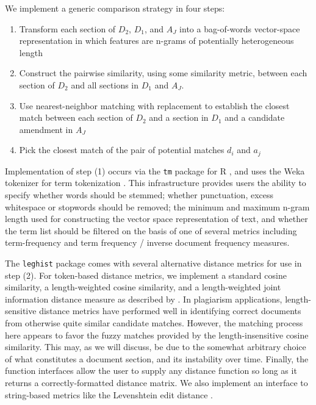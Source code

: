 \documentclass[11pt]{article}
\begin{document}
We implement a generic comparison strategy in four steps:
\begin{enumerate}
\item Transform each section of $D_2$, $D_1$, and $A_J$ into a
  bag-of-words vector-space representation in which features are
  n-grams of potentially heterogeneous length
\item Construct the pairwise similarity, using some similarity metric,
  between each section of $D_2$ and all sections in $D_1$ and $A_J$.
\item Use nearest-neighbor matching with replacement to establish
  the closest match between each section of $D_2$ and a section in
  $D_1$ and a candidate amendment in $A_J$
\item Pick the closest match of the pair of potential matches $d_i$
  and $a_j$
\end{enumerate}

Implementation of step (1) occurs via the \texttt{tm} package for R \citep{meyer2008text},
and uses the Weka tokenizer for term
tokenization \citep{hall2009weka}. This infrastructure provides users the ability to
specify whether words should be stemmed; whether punctuation, excess
whitespace or stopwords should be
removed; the minimum and maximum n-gram length used for constructing the vector space
representation of text, and whether the term list should be filtered
on the basis of one of several metrics including term-frequency and
term frequency / inverse document frequency measures. 

The \texttt{leghist} package comes with several alternative distance metrics for use
in step (2). For token-based distance metrics, we implement a standard cosine similarity, a
length-weighted cosine similarity, and a length-weighted joint
information distance measure as described by \cite{hoad2003methods}. In plagiarism applications, length-sensitive
distance metrics have performed well in identifying correct documents
from otherwise quite similar candidate matches. However,
the matching process here appears to favor the fuzzy matches provided
by the length-insensitive cosine similarity. This may, as we will discuss, be due to the
somewhat arbitrary choice of what constitutes a document section, and
its instability over time. Finally, the function interfaces allow the
user to supply any distance function so long as it returns a
correctly-formatted distance matrix. We also implement an interface to
string-based metrics like the Levenshtein edit distance \citep{elmagarmid2007}.
\end{document}
